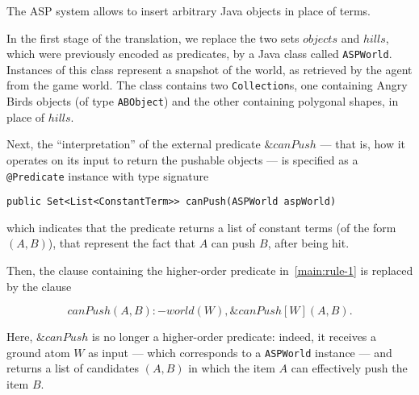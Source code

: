 The ASP system \al allows to insert arbitrary Java objects in place of terms.

In the first stage of the translation, we replace the two sets $objects$ and $hills$, which were previously encoded as predicates, by a Java class called \texttt{ASPWorld}. Instances of this class represent a snapshot of the world, as retrieved by the agent from the game world.
The class contains two \texttt{Collection}s, one containing Angry Birds objects (of type \texttt{ABObject}) and the other containing polygonal shapes, in place of $hills$.

Next, the ``interpretation'' of the external predicate $\&canPush$ --- that is, how it operates on its input to return the pushable objects ---  is specified as a \texttt{@Predicate} instance with type signature
\begin{center}
    \texttt{public Set<List<ConstantTerm>> canPush(ASPWorld aspWorld)}
\end{center}
which indicates that the predicate returns a list of constant terms (of the form \((A,B)\)), that represent the fact that \(A\) can push \(B\), after being hit.

Then, the clause containing the higher-order predicate in~\eqref{main:rule-1} is replaced by the clause

$$ canPush(A,B) :- world(W), \&canPush[W](A,B). \label{main:rule-3} $$

Here, $\&canPush$ is no longer a higher-order predicate: indeed, it receives a ground atom $W$ as input --- which corresponds to a \texttt{ASPWorld} instance --- and returns a list of candidates $(A,B)$ in which the item $A$ can effectively push the item $B$.


